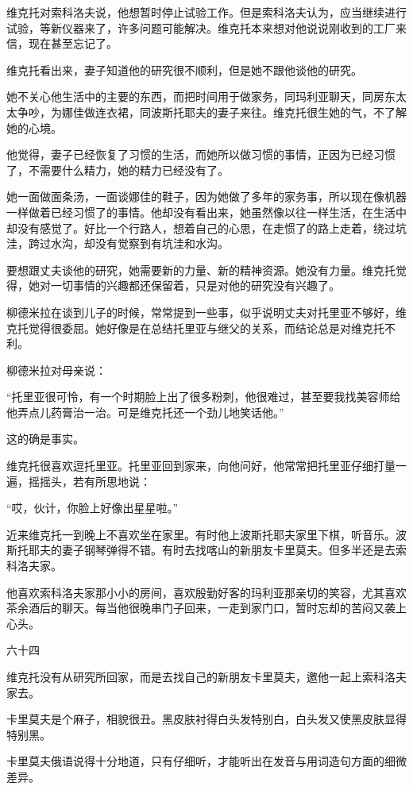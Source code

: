 维克托对索科洛夫说，他想暂时停止试验工作。但是索科洛夫认为，应当继续进行试验，等新仪器来了，许多问题可能解决。维克托本来想对他说说刚收到的工厂来信，现在甚至忘记了。

维克托看出来，妻子知道他的研究很不顺利，但是她不跟他谈他的研究。

她不关心他生活中的主要的东西，而把时间用于做家务，同玛利亚聊天，同房东太太争吵，为娜佳做连衣裙，同波斯托耶夫的妻子来往。维克托很生她的气，不了解她的心境。

他觉得，妻子已经恢复了习惯的生活，而她所以做习惯的事情，正因为已经习惯了，不需要什么精力，她的精力已经没有了。

她一面做面条汤，一面谈娜佳的鞋子，因为她做了多年的家务事，所以现在像机器一样做着已经习惯了的事情。他却没有看出来，她虽然像以往一样生活，在生活中却没有感觉了。好比一个行路人，想着自己的心思，在走惯了的路上走着，绕过坑洼，跨过水沟，却没有觉察到有坑洼和水沟。

要想跟丈夫谈他的研究，她需要新的力量、新的精神资源。她没有力量。维克托觉得，她对一切事情的兴趣都还保留着，只是对他的研究没有兴趣了。

柳德米拉在谈到儿子的时候，常常提到一些事，似乎说明丈夫对托里亚不够好，维克托觉得很委屈。她好像是在总结托里亚与继父的关系，而结论总是对维克托不利。

柳德米拉对母亲说：

“托里亚很可怜，有一个时期脸上出了很多粉刺，他很难过，甚至要我找美容师给他弄点儿药膏治一治。可是维克托还一个劲儿地笑话他。”

这的确是事实。

维克托很喜欢逗托里亚。托里亚回到家来，向他问好，他常常把托里亚仔细打量一遍，摇摇头，若有所思地说：

“哎，伙计，你脸上好像出星星啦。”

近来维克托一到晚上不喜欢坐在家里。有时他上波斯托耶夫家里下棋，听音乐。波斯托耶夫的妻子钢琴弹得不错。有时去找喀山的新朋友卡里莫夫。但多半还是去索科洛夫家。

他喜欢索科洛夫家那小小的房间，喜欢殷勤好客的玛利亚那亲切的笑容，尤其喜欢茶余酒后的聊天。每当他很晚串门子回来，一走到家门口，暂时忘却的苦闷又袭上心头。

六十四

维克托没有从研究所回家，而是去找自己的新朋友卡里莫夫，邀他一起上索科洛夫家去。

卡里莫夫是个麻子，相貌很丑。黑皮肤衬得白头发特别白，白头发又使黑皮肤显得特别黑。

卡里莫夫俄语说得十分地道，只有仔细听，才能听出在发音与用词造句方面的细微差异。

